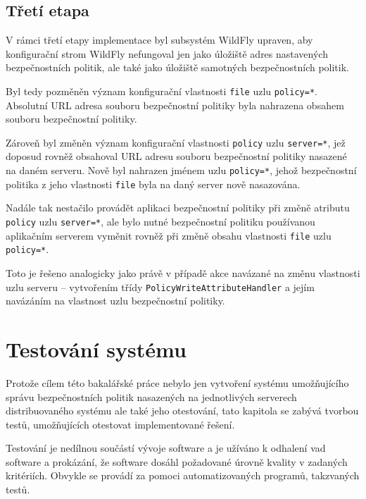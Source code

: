 \section{Třetí etapa}

V rámci třetí etapy implementace byl subsystém WildFly upraven, aby konfigurační strom WildFly nefungoval jen jako úložiště adres nastavených bezpečnostních politik, ale také jako úložiště samotných bezpečnostních politik.

Byl tedy pozměněn význam konfigurační vlastnosti {\tt file} uzlu {\tt policy=*}. Absolutní URL adresa souboru  bezpečnostní politiky byla nahrazena obsahem souboru bezpečnostní politiky.

Zároveň byl změněn význam konfigurační vlastnosti {\tt policy} uzlu {\tt server=*}, jež doposud rovněž obsahoval URL adresu souboru bezpečnostní politiky nasazené na daném serveru. Nově byl nahrazen jménem uzlu {\tt policy=*}, jehož bezpečnostní politika z jeho vlastnosti {\tt file} byla na daný server nově nasazována.

Nadále tak nestačilo provádět aplikaci bezpečnostní politiky při změně atributu {\tt policy} uzlu {\tt server=*}, ale bylo nutné bezpečnostní politiku používanou aplikačním serverem vyměnit rovněž při změně obsahu vlastnosti {\tt file} uzlu {\tt policy=*}.

Toto je řešeno analogicky jako právě v případě akce navázané na změnu vlastnosti uzlu serveru -- vytvořením třídy {\tt PolicyWriteAttributeHandler} a jejím navázáním na vlastnost uzlu bezpečnostní politiky.

\chapter{Testování systému} \label{testovani}

Protože cílem této bakalářské práce nebylo jen vytvoření systému umožňujícího správu bezpečnostních politik nasazených na jednotlivých serverech distribuovaného systému ale také jeho otestování, tato kapitola se zabývá tvorbou testů, umožňujících otestovat implementované řešení.

Testování je nedílnou součástí vývoje software a je užíváno k odhalení vad software a prokázání, že software dosáhl požadované úrovně kvality v zadaných kritériích. Obvykle se provádí za pomoci automatizovaných programů, takzvaných testů. \cite{ivsTest}

